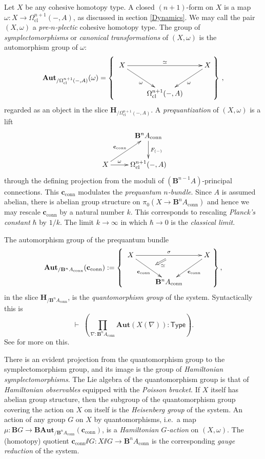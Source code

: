 \documentclass[copyright]{eptcs}
\newcommand{\type}{\ensuremath{\mathsf{Type}}\xspace}
\newcommand{\ssl}{\mathord{\sslash}}
\begin{document}
Let $X$ be any cohesive homotopy type. A closed $(n+1)$-form on $X$ is a map
$\omega : X \to \Omega^{n+1}_{\mathrm{cl}}(-,A)$, as discussed in section \ref{Dynamics}.
We may call the pair $(X, \omega)$ a \emph{pre-$n$-plectic} cohesive homotopy type.
The group of \emph{symplectomorphisms} or \emph{canonical transformations} of $(X, \omega)$
is the automorphism group of $\omega$:
\[
    \mathbf{Aut}_{/\Omega^{n+1}_{\mathrm{\mathrm{cl}}}(-, A)}(\omega)
  =
  \left\{
    \raisebox{20pt}{
    \xymatrix{
       X \ar[rr]^{\simeq} \ar[dr]_{\omega} && X \ar[dl]^{\omega}
     \\
     & \Omega^{n+1}_{\mathrm{cl}}(-,A)
    }
    }
  \right\}
  \,,
\]
regarded as an object in the slice
$\mathbf{H}_{/\Omega^{n+1}_{\mathrm{cl}}(-,A)}$.
A \emph{prequantization} of $(X,\omega)$ is a lift
\[ %
 \raisebox{18pt}{
  \xymatrix{
      & \mathbf{B}^n A_{\mathrm{conn}}
    \ar[d]^{F_{(-)}}
     \\
     X \ar[ur]^-{\mathbf{c}_{\mathrm{conn}}} \ar[r]^-\omega & \Omega^{n+1}_{\mathrm{cl}}(-,A)
  }
  }
\]
through
the defining projection from the moduli of $(\mathbf{B}^{n-1}A)$-principal connections.
This $\mathbf{c}_{\mathrm{conn}}$ modulates the \emph{prequantum $n$-bundle}.
Since $A$ is assumed abelian, there is abelian
group structure on $\pi_0(X \to \mathbf{B}^n A_{\mathrm{conn}})$ and hence we may rescale
$\mathbf{c}_{\mathrm{conn}}$ by a natural number $k$.
This corresponds to rescaling \emph{Planck's constant} $\hbar$ by $1/k$. The limit $k \to \infty$
in which $\hbar \to 0$ is the \emph{classical limit}.


The automorphism group of the prequantum bundle
\[
   \mathbf{Aut}_{/\mathbf{B}^n A_{\mathrm{conn}}}(\mathbf{c}_{\mathrm{conn}})
  :=
  \left\{
    \raisebox{20pt}{
    \xymatrix{
      X \ar[rr]^{\sigma}_{\ }="s" \ar[dr]_{\mathbf{c}_{\mathrm{conn}}}^{\ }="t" & & X \ar[dl]^{\mathbf{c}_{\mathrm{conn}}}
    \\
    & \mathbf{B}^n A_{\mathrm{conn}}
    \ar@{=>}^\simeq "s"; "t"
    }
    }
  \right\},
\]
in the slice $\mathbf{H}_{/\mathbf{B}^n A_{\mathrm{conn}}}$,
is the \emph{quantomorphism group} of the system.
Syntactically this is
$$
  \vdash\; \left(\prod_{\nabla : \mathbf{B}^n A_{\mathrm{conn}}}
    \mathbf{Aut}(X(\nabla))
  :
  \type
  \right).
$$
See \cite{SchreiberErlangen} for more on this.

There is an evident projection from the
quantomorphism group to the symplectomorphism group, and its image is the group of
\emph{Hamiltonian symplectomorphisms}.
The Lie algebra of the quantomorphism group is that of
\emph{Hamiltonian observables} equipped with the \emph{Poisson bracket}.
If $X$ itself has abelian group structure,
then the subgroup of the quantomorphism group covering the action on $X$ on itself is the
\emph{Heisenberg group} of the system.
An action of any group $G$ on $X$ by quantomorphisms, i.e.\ a map
$\mu : \mathbf{B}G \to \mathbf{B}\mathbf{Aut}_{/\mathbf{B}^n A_{\mathrm{conn}}}(\mathbf{c}_{\mathrm{conn}})$,
is a \emph{Hamiltonian $G$-action} on $(X,\omega)$. The (homotopy) quotient
$\mathbf{c}_{\mathrm{conn}}\ssl G : X \ssl G \to \mathbf{B}^n A_{\mathrm{conn}}$ is the
corresponding \emph{gauge reduction} of the system.
\end{document}
